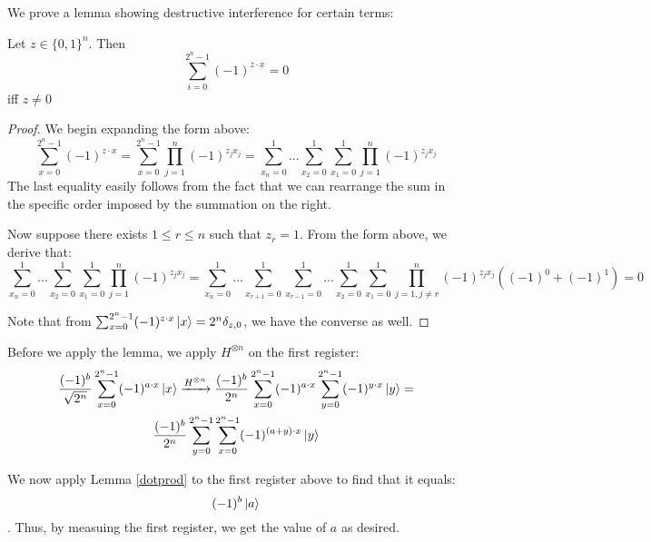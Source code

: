 \documentclass{../quantum.tex}
\begin{document}
We prove a lemma showing destructive interference for certain terms:

\begin{lemma} \label{dotprod}
  Let $z \in \{0,1\}^n$. Then
  $$\sum_{i=0}^{2^n-1} (-1)^{z \cdot x} = 0$$ iff $z \neq 0$
\end{lemma}
\begin{proof}
   We begin expanding the form above:
   $$\sum_{x=0}^{2^n-1} (-1)^{z \cdot x} = \sum_{x=0}^{2^n -1}\prod_{j=1}^n (-1)^{z_jx_j} = \sum_{x_n = 0}^1...\sum_{x_2 = 0}^1\sum_{x_1 = 0}^1 \prod_{j=1}^n (-1)^{z_jx_j}   $$
   The last equality easily follows from the fact that we can rearrange the sum in the specific order imposed by the summation on the right.

   Now suppose there exists $1 \leq r \leq n$ such that $z_r = 1$. From the form above, we derive that:
   $$\sum_{x_n = 0}^1...\sum_{x_2 = 0}^1\sum_{x_1 = 0}^1 \prod_{j=1}^n (-1)^{z_jx_j} = \sum_{x_n = 0}^1...\sum_{x_{r+1} = 0}^1\sum_{x_{r-1} = 0}^1... \sum_{x_2 = 0}^1\sum_{x_1 = 0}^1 \prod_{j=1,j \neq r}^n (-1)^{z_jx_j} ((-1)^0 + (-1)^1) = 0 $$

   Note that from $\sum_{x=0}^{2^n-1} (-1)^{z \cdot x} \ket{x} = 2^n\delta_{z,0}$, we have the converse as well.
\end{proof}
Before we apply the lemma, we apply $H^{\otimes n}$ on the first register:
\begin{gather}
  \frac{(-1)^b}{\sqrt{2^n}} \sum_{x=0}^{2^n-1}(-1)^{a\cdot x}\ket{x} \xrightarrow{H^{\otimes n}} \frac{(-1)^b}{2^n}\sum_{x=0}^{2^n -1}  (-1)^{a\cdot x} \sum_{y=0}^{2^n -1} (-1)^{y \cdot x} \ket{y} = \\
  \frac{(-1)^b}{2^n}\sum_{y=0}^{2^n -1}\sum_{x=0}^{2^n -1}(-1)^{(a+y)\cdot x} \ket{y}
\end{gather}

We now apply Lemma \ref{dotprod} to the first register above to find that it equals:
$$(-1)^b \ket{a} $$. Thus, by measuing the first register, we get the value of $a$ as desired.
\end{document}
